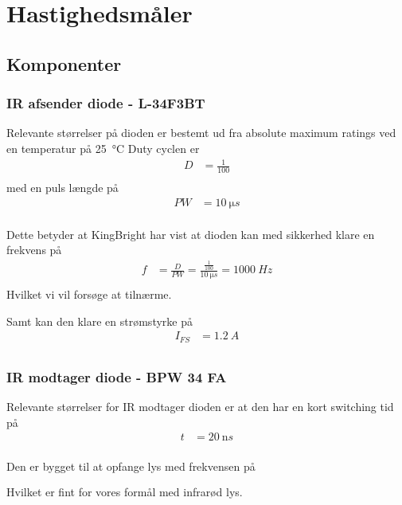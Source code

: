 \section{Hastighedsmåler}


\subsection{Komponenter}
\subsubsection{IR afsender diode - L-34F3BT}

Relevante størrelser på dioden \cite{kompIRafsender} er bestemt ud fra absolute maximum ratings ved en temperatur på \SI{25}{\celsius} 
Duty cyclen er
\begin{align}
	D &= \frac{1}{100} \\
\end{align}
med en puls længde på 
\begin{align}
	PW &= \SI{10}{\micro s} \\
\end{align}

Dette betyder at KingBright har vist at dioden kan med sikkerhed klare en frekvens på
\begin{align}
	f &=  \frac{D}{PW} =  \frac{\frac{1}{100}}{\SI{10}{\micro s}} = \SI{1000}{Hz}\label{eq:oensketFrekvens}\\ 
\end{align}
Hvilket vi vil forsøge at tilnærme.

Samt kan den klare en strømstyrke på 
\begin{align}
	I_{FS} &= \SI{1.2}{A} \\
\end{align}

\subsubsection{IR modtager diode - BPW 34 FA}
Relevante størrelser for IR modtager dioden \cite{kompIRmodtager} er at den har en kort switching tid på
\begin{align}
	t &= \SI{20}{\nano s} \\
\end{align}

Den er bygget til at opfange lys med frekvensen på
\begin{align}
	 [\SI{730}{nm};\SI{1100}{nm}] \\
\end{align}
Hvilket er fint for vores formål med infrarød lys.
